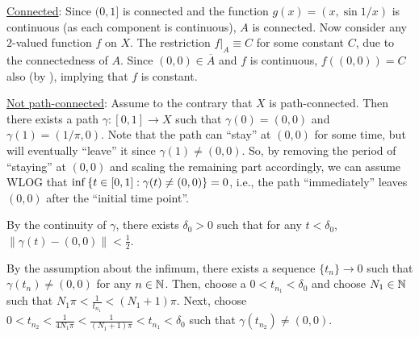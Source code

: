 \begin{enumerate}
\begin{pf}
\underline{Connected}: Since \((0,1]\) is connected and the function
\(g(x)=(x,\sin 1/x)\) is continuous (as each component is continuous), \(A\) is
connected. Now consider any \(2\)-valued function \(f\) on \(X\). The
restriction \(f|_{A}\equiv C\) for some constant \(C\), due to the
connectedness of \(A\). Since \((0,0)\in\overline{A}\) and \(f\) is continuous,
\(f((0,0))=C\) also (by ),
implying that \(f\) is constant.

\underline{Not path-connected}: Assume to the contrary that \(X\) is
path-connected. Then there exists a path \(\gamma:[0,1]\to X\) such that
\(\gamma(0)=(0,0)\) and \(\gamma(1)=(1/\pi,0)\). Note that the path can
``stay'' at \((0,0)\) for some time, but will eventually ``leave'' it since
\(\gamma(1)\ne (0,0)\). So, by removing the period of ``staying'' at \((0,0)\)
and scaling the remaining part accordingly, we can assume WLOG that
\(\inf\qty{t\in [0,1]: \gamma(t)\ne (0,0)}=0\), i.e., the path ``immediately''
leaves \((0,0)\) after the ``initial time point''.
\begin{center}
\end{center}

By the continuity of \(\gamma\), there exists \(\delta_0>0\) such
that for any \(t<\delta_0\), \(\|\gamma(t)-(0,0)\|<\frac{1}{2}\).

By the assumption about the infimum, there exists a sequence \(\{t_n\}\to 0\)
such that \(\gamma(t_n)\ne (0,0)\) for any \(n\in\mathbb{N}\). Then, choose a
\(0<t_{n_1}<\delta_0\) and choose \(N_1\in\mathbb{N}\) such that
\(N_1\pi<\frac{1}{t_{n_1}}<(N_1+1)\pi\). Next, choose
\(\displaystyle
0<t_{n_2}<\frac{1}{4N_1\pi}<\frac{1}{(N_1+1)\pi}<t_{n_1}<\delta_0\) such that
\(\gamma(t_{n_2})\ne (0,0)\).


\end{pf}
\end{enumerate}
